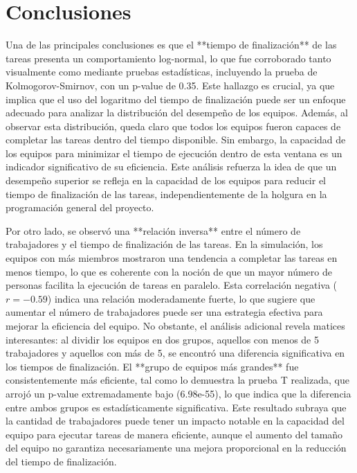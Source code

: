 \documentclass[a4paper, 12pt]{article}
\begin{document}
\section{Conclusiones}
Una de las principales conclusiones es que el **tiempo de finalización** de las tareas presenta un comportamiento log-normal, lo que fue corroborado tanto visualmente como mediante pruebas estadísticas, incluyendo la prueba de Kolmogorov-Smirnov, con un p-value de 0.35. Este hallazgo es crucial, ya que implica que el uso del logaritmo del tiempo de finalización puede ser un enfoque adecuado para analizar la distribución del desempeño de los equipos. Además, al observar esta distribución, queda claro que todos los equipos fueron capaces de completar las tareas dentro del tiempo disponible. Sin embargo, la capacidad de los equipos para minimizar el tiempo de ejecución dentro de esta ventana es un indicador significativo de su eficiencia. Este análisis refuerza la idea de que un desempeño superior se refleja en la capacidad de los equipos para reducir el tiempo de finalización de las tareas, independientemente de la holgura en la programación general del proyecto.

Por otro lado, se observó una **relación inversa** entre el número de trabajadores y el tiempo de finalización de las tareas. En la simulación, los equipos con más miembros mostraron una tendencia a completar las tareas en menos tiempo, lo que es coherente con la noción de que un mayor número de personas facilita la ejecución de tareas en paralelo. Esta correlación negativa (\(r = -0.59\)) indica una relación moderadamente fuerte, lo que sugiere que aumentar el número de trabajadores puede ser una estrategia efectiva para mejorar la eficiencia del equipo. No obstante, el análisis adicional revela matices interesantes: al dividir los equipos en dos grupos, aquellos con menos de 5 trabajadores y aquellos con más de 5, se encontró una diferencia significativa en los tiempos de finalización. El **grupo de equipos más grandes** fue consistentemente más eficiente, tal como lo demuestra la prueba T realizada, que arrojó un p-value extremadamente bajo (6.98e-55), lo que indica que la diferencia entre ambos grupos es estadísticamente significativa. Este resultado subraya que la cantidad de trabajadores puede tener un impacto notable en la capacidad del equipo para ejecutar tareas de manera eficiente, aunque el aumento del tamaño del equipo no garantiza necesariamente una mejora proporcional en la reducción del tiempo de finalización.
\end{document}
